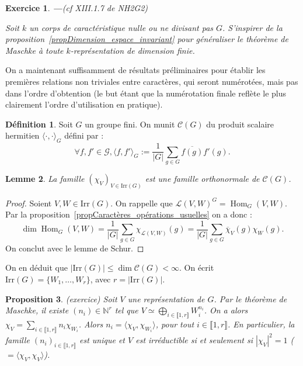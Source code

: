 \documentclass[a4paper]{article}
\newcounter{question}
\newtheorem{enonce}{Exercice}
\newenvironment{exo}[0]{\begin{enonce}{\bf ---}\rm\setcounter{question}{1}}{\end{enonce}}
\theoremstyle{definition} %
\newtheorem{Def}{Définition}[section] %
\theoremstyle{plain} %
\newtheorem{Prop}[Def]{Proposition} %
\newtheorem{Lem}[Def]{Lemme} %
\theoremstyle{remark} %
\newcommand{\N}{\mathbb{N}}
\newcommand{\Hom}{\operatorname{Hom}}
\newcommand{\Irr}{\mathrm{Irr}(G)}
\begin{document}
\begin{exo}(cf XIII.1.7 de NH2G2) 

\hspace*{\fill}
Soit $k$ un corps de caractéristique nulle ou ne divisant pas $G$. S'inspirer de la proposition~\ref{propDimension_espace_invariant} pour généraliser le théorème de Maschke à toute $k$-représentation de dimension finie. 
\end{exo}


On a maintenant suffisamment de résultats préliminaires pour établir les premières relations non triviales entre caractères, qui seront numérotées, mais pas dans l'ordre d'obtention (le but étant que la numérotation finale reflète le plus clairement l'ordre d'utilisation en pratique).

\begin{Def}
	Soit $G$ un groupe fini. On munit $\mathcal{C}(G)$ du produit scalaire hermitien $\langle \cdot, \cdot \rangle_G$ défini  par : \[\forall f,f'\in \mathcal{G},\langle f, f' \rangle_G := \frac{1}{|G|} \sum_{g \in  G} \overline{f(g)} f'(g).\]
\end{Def}

\begin{Lem}\label{lemOrthogonalité_caractères}
La famille $(\chi_V)_{V\in \Irr}$ est une famille orthonormale de $\mathcal{C}(G)$.
\end{Lem}

\begin{proof}
Soient $V,W\in \Irr$. On rappelle que $\mathcal{L}(V,W)^{G}=\Hom_G(V,W)$. Par la proposition~\ref{propCaractères_opérations_usuelles} on a donc : \[\dim \Hom_G(V,W)=\frac{1}{|G|}\sum_{g\in G}\chi_{\mathcal{L}(V,W)}(g)=\frac{1}{|G|}\sum_{g\in G}\overline{\chi}_V(g)\chi_W(g).\] On conclut avec le lemme de Schur.
\end{proof}

On en déduit que $|\Irr|\leq \dim \mathcal{C}(G)<\infty$. On écrit $\Irr=\{W_1,\ldots,W_r\}$, avec $r=|\Irr|$.

\begin{Prop}(exercice)
 Soit $V$ une représentation  de $G$. Par le théorème de Maschke, il existe $(n_i)\in \N^r$ tel que $V\simeq \bigoplus_{i\in \llbracket 1,r\rrbracket}W_i^{n_i}$. On a alors $\chi_V=\sum_{i\in \llbracket 1,r\rrbracket} n_i\chi_{W_i}$. Alors $n_i=\langle \chi_V,\chi_{W_i}\rangle$, pour tout $i\in \llbracket 1,r\rrbracket$. En particulier, la famille $(n_i)_{i\in \llbracket 1,r\rrbracket}$ est unique et $V$ est irréductible si et seulement si $|\chi_V|^2=1$ ($=\langle \chi_V,\chi_V\rangle$).
\end{Prop}
\end{document}

